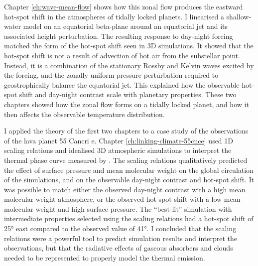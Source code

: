 Chapter \ref{ch:wave-mean-flow} shows how this zonal flow produces the eastward hot-spot shift in the atmospheres of tidally locked planets. I linearised a shallow-water model on an equatorial beta-plane around an equatorial jet and its associated height perturbation. The resulting response to day-night forcing matched the form of the hot-spot shift seen in 3D simulations. It showed that the hot-spot shift is not a result of advection of hot air from the substellar point. Instead, it is a combination of the stationary Rossby and Kelvin waves excited by the forcing, and the zonally uniform pressure perturbation required to geostrophically balance the equatorial jet. This explained how the observable hot-spot shift and day-night contrast scale with planetary properties. These two chapters showed how the zonal flow forms on a tidally locked planet, and how it then affects the observable temperature distribution.


I applied the theory of the first two chapters to a case study of  the observations of the lava planet 55 Cancri e. Chapter \ref{ch:linking-climate-55cnce} used 1D scaling relations and idealised 3D atmospheric simulations to interpret the thermal phase curve measured by \citet{demory201655cnce}. The scaling relations qualitatively predicted the effect of surface pressure and mean molecular weight on the global circulation of the simulations, and on the observable day-night contrast and hot-spot shift. It was possible to match either the observed day-night contrast with a high mean molecular weight atmosphere, or the observed hot-spot shift with a low mean molecular weight and high surface pressure. The ``best-fit'' simulation with intermediate properties selected using the scaling relations had a hot-spot shift of \ang{25} east compared to the observed value of \ang{41}. I concluded that the scaling relations were a powerful tool to predict simulation results and interpret the observations, but that the radiative effects of gaseous absorbers and clouds needed to be represented to properly model the thermal emission.


